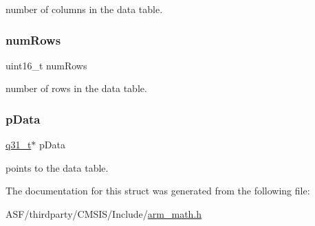 number of columns in the data table. \mbox{\label{structarm__bilinear__interp__instance__q31_a1bcf80ccdc2acc29198f1592ae300390}} 
\subsubsection{\texorpdfstring{numRows}{numRows}}
{\footnotesize\ttfamily uint16\+\_\+t num\+Rows}

number of rows in the data table. \mbox{\label{structarm__bilinear__interp__instance__q31_ad296f76577326ff280726323536eed6d}} 
\subsubsection{\texorpdfstring{pData}{pData}}
{\footnotesize\ttfamily \mbox{\hyperlink{arm__math_8h_adc89a3547f5324b7b3b95adec3806bc0}{q31\+\_\+t}}$\ast$ p\+Data}

points to the data table. 

The documentation for this struct was generated from the following file\+:\begin{DoxyCompactItemize}
\item 
A\+S\+F/thirdparty/\+C\+M\+S\+I\+S/\+Include/\mbox{\hyperlink{arm__math_8h}{arm\+\_\+math.\+h}}\end{DoxyCompactItemize}
